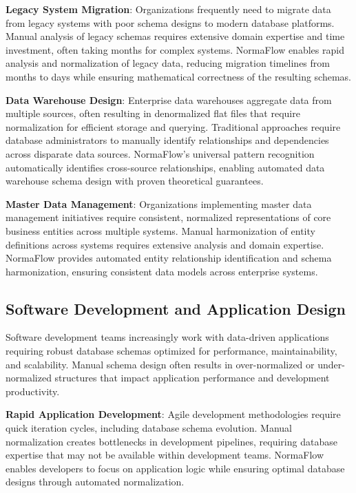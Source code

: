 \documentclass[acmsmall]{acmart}
\newcommand{\parab}[1]{\vspace{0.05in}\noindent\textbf{#1}}
\begin{document}
\parab{Legacy System Migration}: Organizations frequently need to migrate data from legacy systems with poor schema designs to modern database platforms. Manual analysis of legacy schemas requires extensive domain expertise and time investment, often taking months for complex systems. NormaFlow enables rapid analysis and normalization of legacy data, reducing migration timelines from months to days while ensuring mathematical correctness of the resulting schemas.

\parab{Data Warehouse Design}: Enterprise data warehouses aggregate data from multiple sources, often resulting in denormalized flat files that require normalization for efficient storage and querying. Traditional approaches require database administrators to manually identify relationships and dependencies across disparate data sources. NormaFlow's universal pattern recognition automatically identifies cross-source relationships, enabling automated data warehouse schema design with proven theoretical guarantees.

\parab{Master Data Management}: Organizations implementing master data management initiatives require consistent, normalized representations of core business entities across multiple systems. Manual harmonization of entity definitions across systems requires extensive analysis and domain expertise. NormaFlow provides automated entity relationship identification and schema harmonization, ensuring consistent data models across enterprise systems.

\subsection{Software Development and Application Design}

Software development teams increasingly work with data-driven applications requiring robust database schemas optimized for performance, maintainability, and scalability. Manual schema design often results in over-normalized or under-normalized structures that impact application performance and development productivity.

\parab{Rapid Application Development}: Agile development methodologies require quick iteration cycles, including database schema evolution. Manual normalization creates bottlenecks in development pipelines, requiring database expertise that may not be available within development teams. NormaFlow enables developers to focus on application logic while ensuring optimal database designs through automated normalization.
\end{document}
